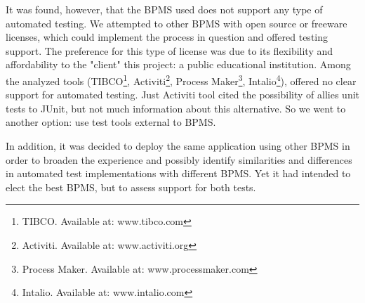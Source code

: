 \documentclass[runningheads,a4paper]{llncs}
\begin{document}
{%
It was found, however, that the BPMS used does not support any type of automated testing. We attempted to other BPMS with open source or freeware licenses, which could implement the process in question and offered testing support. The preference for this type of license was due to its flexibility and affordability to the "client" this project: a public educational institution.
Among the analyzed tools (TIBCO\footnote{TIBCO. Available at: www.tibco.com}, Activiti\footnote{Activiti. Available at: www.activiti.org}, Process Maker\footnote{Process Maker. Available at: www.processmaker.com}, Intalio\footnote{Intalio. Available at: www.intalio.com}), offered no clear support for automated testing. Just Activiti tool cited the possibility of allies unit tests to JUnit, but not much information about this alternative. So we went to another option: use test tools external to BPMS.

In addition, it was decided to deploy the same application using other BPMS in order to broaden the experience and possibly identify similarities and differences in automated test implementations with different BPMS. Yet it had intended to elect the best BPMS, but to assess support for both tests.

}
\end{document}
